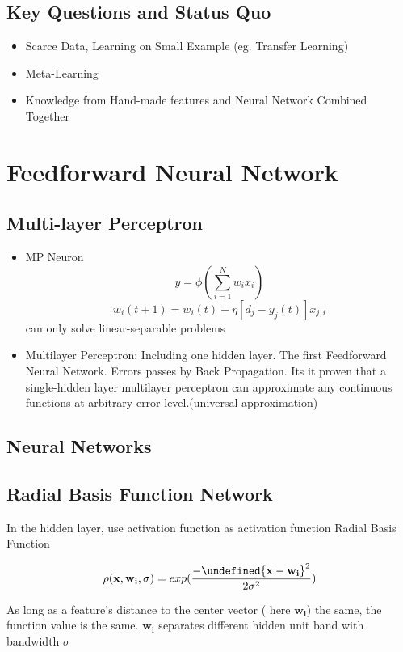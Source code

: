 \documentclass[11pt, openany]{book}              %
\let\norm\undefined %
\DeclarePairedDelimiter\norm{\lVert}{\rVert}
\begin{document}
\section{Key Questions and Status Quo}

\begin{itemize}
	\item Scarce Data, Learning on Small Example (eg. Transfer Learning)
	\item Meta-Learning
	\item Knowledge from Hand-made features and Neural Network Combined Together 
\end{itemize}


\chapter{Feedforward Neural Network}
\section{Multi-layer Perceptron}

\begin{itemize}
    \item MP Neuron $$y = \phi(\sum_{i=1}^N w_ix_i)$$ $$w_i(t+1) = w_i(t) + \eta [d_j-y_j(t)]x_{j,i}$$ can only solve linear-separable problems
    \item Multilayer Perceptron: Including one hidden layer. The first Feedforward Neural Network. Errors passes by Back Propagation. Its it proven that a single-hidden layer multilayer perceptron can approximate any continuous functions at arbitrary error level.(universal approximation)
\end{itemize}

\section{Neural Networks}

\section{Radial Basis Function Network}

In the hidden layer, use activation function as activation function 
Radial Basis Function

$$ \rho(\mathbf{x,w_i},\sigma) = exp(\frac{ -{\norm{ \mathbf{x} - \mathbf{w_i} }}^2}{2\sigma^2})$$

As long as a feature's distance to the center vector ( here $\mathbf{w_i}$) the same, the function value is the same. $\mathbf{w_i}$ separates different hidden unit band with bandwidth $\sigma$ 
\end{document}
